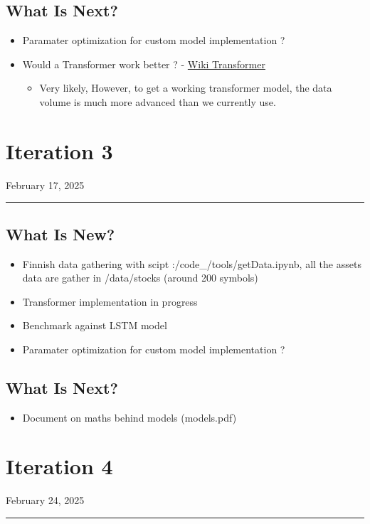 \documentclass[letterpaper,11pt]{article}
\begin{document}
\subsection*{What Is Next?}
\begin{itemize}
  \item Paramater optimization for custom model implementation ?
  \item Would a Transformer work better ? - \href{https://en.wikipedia.org/wiki/Transformer_(deep_learning_architecture)}{Wiki Transformer}
  \begin{itemize}
    \item Very likely, However, to get a working transformer model, the data volume is much more advanced than we currently use.
  \end{itemize}
\end{itemize}

\newpage
\section*{Iteration 3}
\begin{flushright}
February 17, 2025
\end{flushright}
\hrule
\vspace{0.2in}
\subsection*{What Is New?}
\begin{itemize}
  \item Finnish data gathering with scipt :/code\_/tools/getData.ipynb, all the assets data are gather in /data/stocks (around 200 symbols)
  \item Transformer implementation in progress
  \item Benchmark against LSTM model
  \item Paramater optimization for custom model implementation ?
\end{itemize}

\subsection*{What Is Next?}
\begin{itemize}
  \item Document on maths behind models (models.pdf)
\end{itemize}


\newpage
\section*{Iteration 4}
\begin{flushright}
February 24, 2025
\end{flushright}
\hrule
\vspace{0.2in}
\end{document}
